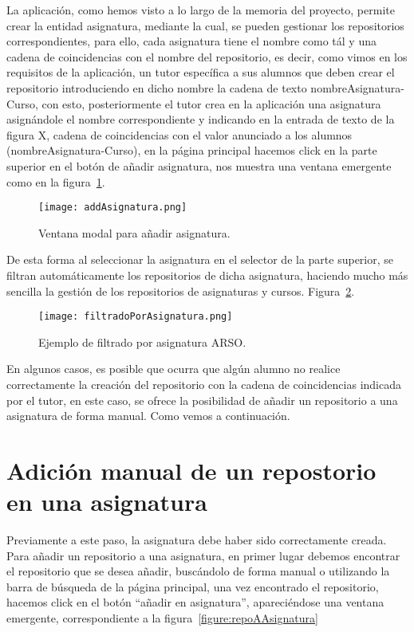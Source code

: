     La aplicación, como hemos visto a lo largo de la memoria del proyecto, permite crear la entidad asignatura, mediante la cual, se pueden gestionar los repositorios correspondientes, para ello, cada asignatura tiene el nombre como tál y una cadena de coincidencias con el nombre del repositorio, es decir, como vimos en los requisitos de la aplicación, un tutor específica a sus alumnos que deben crear el repositorio introduciendo en dicho nombre la cadena de texto nombreAsignatura-Curso, con esto, posteriormente el tutor crea en la aplicación una asignatura asignándole el nombre correspondiente y indicando en la entrada de texto de la figura X, cadena de coincidencias con el valor anunciado a los alumnos (nombreAsignatura-Curso), en la página principal hacemos click en la parte superior en el botón de añadir asignatura, nos muestra una ventana emergente como en la figura~\ref{figure:addAsignatura}.

    \begin{figure}[h!]
      \texttt{[image: addAsignatura.png]}
      \caption{Ventana modal para añadir asignatura.}
      \label{figure:addAsignatura}
    \end{figure}

    De esta forma al seleccionar la asignatura en el selector de la parte superior, se filtran automáticamente los repositorios de dicha asignatura, haciendo mucho más sencilla la gestión de los repositorios de asignaturas y cursos. Figura~\ref{figure:filtradoAsignatura}.

    \begin{figure}[h!]
      \texttt{[image: filtradoPorAsignatura.png]}
      \caption{Ejemplo de filtrado por asignatura ARSO.}
      \label{figure:filtradoAsignatura}
    \end{figure}
    En algunos casos, es posible que ocurra que algún alumno no realice correctamente la creación del repositorio con la cadena de coincidencias indicada por el tutor, en este caso, se ofrece la posibilidad de añadir un repositorio a una asignatura de forma manual. Como vemos a continuación.




\section{Adición manual de un repostorio en una asignatura}


    Previamente a este paso, la asignatura debe haber sido correctamente creada.
    Para añadir un repositorio a una asignatura, en primer lugar debemos encontrar el repositorio que se desea añadir, buscándolo de forma manual o utilizando la barra de búsqueda de la página principal, una vez encontrado el repositorio, hacemos click en el botón “añadir en asignatura”, apareciéndose una ventana emergente, correspondiente a la figura~\ref{figure:repoAAsignatura}

